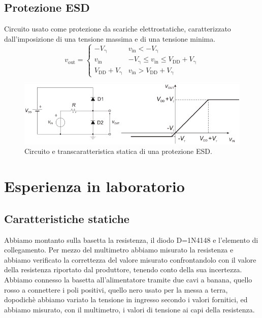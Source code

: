 \documentclass[a4paper]{article}
\begin{document}
{{		\subsection{Protezione ESD}
			Circuito usato come protezione da scariche elettrostatiche, caratterizzato dall'imposizione di una tensione massima e di una tensione minima.
			\begin{equation*}
				v_{\mathrm{out}} =
				\begin{cases}
					-V_{\mathrm{\gamma}}				  & v_{\mathrm{in}} < -V_{\mathrm{\gamma}} \\
					v_{\mathrm{in}} 				 	  & -V_{\mathrm{\gamma}} \le v_{\mathrm{in}} \le V_{\mathrm{DD}} + V_{\mathrm{\gamma}} \\
					V_{\mathrm{DD}} + V_{\mathrm{\gamma}} & v_{\mathrm{in}} > V_{\mathrm{DD}} + V_{\mathrm{\gamma}}
				\end{cases}
			\end{equation*}
			\begin{figure}[h!]
				\centering
				\includegraphics[scale=0.7]{transcaratteristicaStaticaProtezioneESD}
				\caption{Circuito e transcaratteristica statica di una protezione ESD.}
				\label{fig:transcaratteristicaStaticaProtezioneESD}
			\end{figure}
	\section{Esperienza in laboratorio}
		\subsection{Caratteristiche statiche}
			Abbiamo montanto sulla basetta la resistenza, il diodo D=1N4148 e l'elemento di collegamento.
			Per mezzo del multimetro abbiamo misurato la resistenza e abbiamo verificato la correttezza del valore misurato confrontandolo con il valore della resistenza riportato dal produttore, tenendo conto della sua incertezza.
			Abbiamo connesso la basetta all'alimentatore tramite due cavi a banana, quello rosso a connettere i poli positivi, quello nero usato per la messa a terra, dopodichè abbiamo variato la tensione in ingresso secondo i valori fornitici, ed abbiamo misurato, con il multimetro, i valori di tensione ai capi della resistenza.
			
}}
\end{document}

